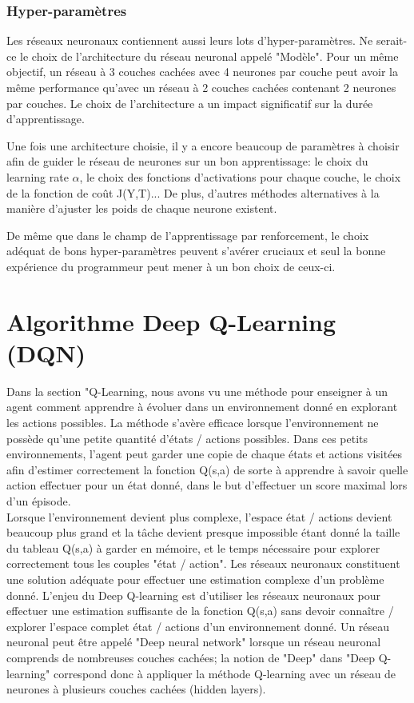 \documentclass[11pt,a4paper]{report}
\begin{document}
  \subsubsection{Hyper-paramètres}
  
    \par Les réseaux neuronaux contiennent aussi leurs lots d'hyper-paramètres. Ne serait-ce le choix de l'architecture du réseau neuronal appelé "Modèle". Pour un même objectif, un réseau à 3 couches cachées avec 4 neurones par couche peut avoir la même performance qu'avec un réseau à 2 couches cachées contenant 2 neurones par couches.  Le choix de l'architecture a un impact significatif sur la durée d'apprentissage. 
  
    \par Une fois une architecture choisie, il y a encore beaucoup de paramètres à choisir afin de guider le réseau de neurones sur un bon apprentissage: le choix du learning rate $\alpha$, le choix des fonctions d'activations pour chaque couche, le choix de la fonction de coût J(Y,T)... De plus, d'autres méthodes alternatives à la manière d'ajuster les poids de chaque neurone existent.
  
    \par De même que dans le champ de l'apprentissage par renforcement, le choix adéquat de bons hyper-paramètres peuvent s'avérer cruciaux et seul la bonne expérience du programmeur peut mener à un bon choix de ceux-ci.   
  

  \section{Algorithme Deep Q-Learning (DQN)}
  
    \par Dans la section "Q-Learning, nous avons vu une méthode pour enseigner à un agent comment apprendre à évoluer dans un environnement donné en explorant les actions possibles. La méthode s'avère efficace lorsque l'environnement ne possède qu'une petite quantité d'états / actions possibles. Dans ces petits environnements, l'agent peut garder une copie de chaque états et actions visitées afin d'estimer correctement la fonction Q(s,a) de sorte à apprendre à savoir quelle action effectuer pour un état donné, dans le but d'effectuer un score maximal lors d'un épisode. \\ 
   Lorsque l'environnement devient plus complexe, l'espace état / actions devient beaucoup plus grand et la tâche devient presque impossible étant donné la taille du tableau Q(s,a) à garder en mémoire, et le temps nécessaire pour explorer correctement tous les couples "état / action". Les réseaux neuronaux constituent une solution  adéquate pour effectuer une estimation complexe d'un problème donné. L'enjeu du Deep Q-learning est d'utiliser les réseaux neuronaux pour effectuer une estimation suffisante de la fonction Q(s,a) sans devoir connaître / explorer l'espace complet état / actions d'un environnement donné. Un réseau neuronal peut être appelé "Deep neural network" lorsque un réseau neuronal comprends de nombreuses couches cachées; la notion de "Deep" dans "Deep Q-learning" correspond donc à appliquer la méthode Q-learning avec un réseau de neurones à plusieurs couches cachées (hidden layers). 
   
\end{document}
